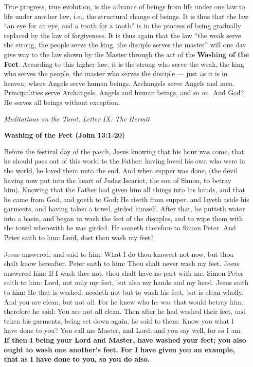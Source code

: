 \begin{quotationx}
True progress, true evolution, is the advance of beings from life under one law to life under another law, i.e., the
structural change of beings. It is thus that the law “an eye for an eye, and a tooth for a tooth” is in the process of
being gradually replaced by the law of forgiveness. It is thus again that the law “the weak serve the strong, the
people serve the king, the disciple serves the master” will one day give way to the law shown by the Master through the
act of the \textbf{Washing of the Feet}. According to this higher law, it is the strong who serve the weak, the king
who serves the people, the master who serves the disciple — just as it is in heaven, where Angels
serve human beings. Archangels serve Angels and men. Principalities serve Archangels, Angels and human beings, and so
on. And God? He serves all beings without exception. 
\begin{flushright} \textit{Meditations on the Tarot. Letter IX: The Hermit}\end{flushright}

\end{quotationx}

\textbf{Washing of the Feet (John 13:1-20)}

Before the festival day of the pasch, Jesus knowing that his hour was come, that he should pass out of this world to the
Father: having loved his own who were in the world, he loved them unto the end. And when supper was done, (the devil
having now put into the heart of Judas Iscariot, the son of Simon, to betray him). Knowing that the Father had given
him all things into his hands, and that he came from God, and goeth to God; He riseth from supper, and layeth aside his
garments, and having taken a towel, girded himself. After that, he putteth water into a basin, and began to wash the
feet of the disciples, and to wipe them with the towel wherewith he was girded. He cometh therefore to Simon Peter. And
Peter saith to him: Lord, dost thou wash my feet?

Jesus answered, and said to him: What I do thou knowest not now; but thou shalt know hereafter. Peter saith to him: Thou
shalt never wash my feet. Jesus answered him: If I wash thee not, thou shalt have no part with me. Simon Peter saith to
him: Lord, not only my feet, but also my hands and my head. Jesus saith to him: He that is washed, needeth not but to
wash his feet, but is clean wholly. And you are clean, but not all. For he knew who he was that would betray him;
therefore he said: You are not all clean. Then after he had washed their feet, and taken his garments, being set down
again, he said to them: Know you what I have done to you? You call me Master, and Lord; and you say well, for so I am.
\textbf{If then I being your Lord and Master, have washed your feet; you also ought to wash one
another's feet. For I have given you an example, that as I have done to you, so you do also.}

